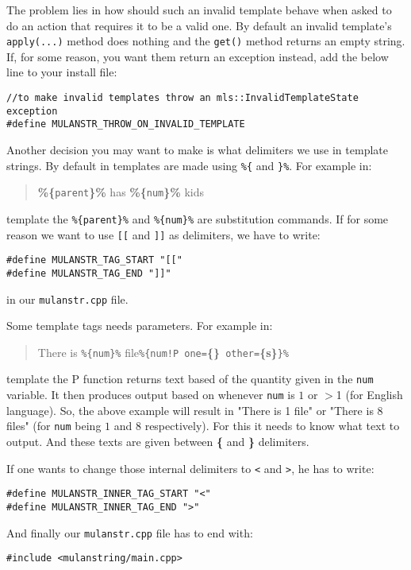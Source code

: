 The problem lies in how should such an invalid template behave when asked to do an action that requires it to be a valid one.
By default an invalid template's \verb+apply(...)+ method does nothing and the \verb+get()+ method returns an empty string.
If, for some reason, you want them return an exception instead, add the below line to your install file:
\begin{verbatim}
//to make invalid templates throw an mls::InvalidTemplateState exception
#define MULANSTR_THROW_ON_INVALID_TEMPLATE
\end{verbatim}

Another decision you may want to make is what delimiters we use in template strings. 
By default in \mulan{} templates are made using \verb+%{+ and \verb+}%+. For example in:
\begin{quotation}
	\textbf{\%\{}\texttt{parent}\textbf{\}\%} has \textbf{\%\{}\texttt{num}\textbf{\}\%} kids
\end{quotation}
template the \verb+%{parent}%+ and \verb+%{num}%+ are substitution commands. 
If for some reason we want to use \verb+[[+ and \verb+]]+ as delimiters, we have to write:
\begin{verbatim}
#define MULANSTR_TAG_START "[["
#define MULANSTR_TAG_END "]]"
\end{verbatim} in our \texttt{mulanstr.cpp} file.

Some template tags needs parameters. For example in:
\begin{quotation}
	There is \verb+%{num}%+ file\verb+%{num!P one=+\textbf{\{\}}\verb+ other=+\textbf{\{s\}}\verb+}%+
\end{quotation}
template the \textsc{P} function returns text based of the quantity given in the \texttt{num} variable. 
It then produces output based on whenever \texttt{num} is $1$ or $>$1 (for English language).
So, the above example will result in "There is 1 file" or "There is 8 files" (for \texttt{num} being $1$ and $8$ respectively).
For this it needs to know what text to output. And these texts are given between \textbf{\{} and \textbf{\}} delimiters.

If one wants to change those internal delimiters to \verb+<+ and \verb+>+, he has to write:
\begin{verbatim}
#define MULANSTR_INNER_TAG_START "<"
#define MULANSTR_INNER_TAG_END ">"
\end{verbatim}

And finally our \texttt{mulanstr.cpp} file has to end with:
\begin{verbatim}
#include <mulanstring/main.cpp>
\end{verbatim}
